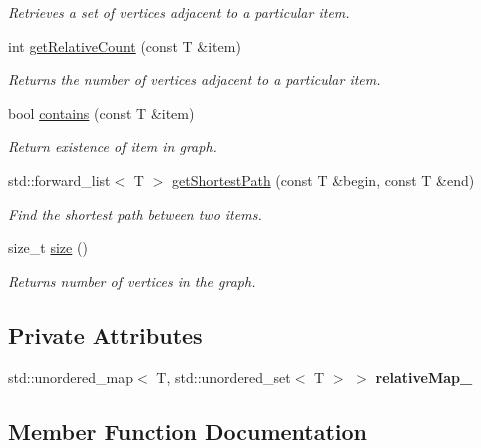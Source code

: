 \begin{DoxyCompactItemize}
\begin{DoxyCompactList}\small\item\em Retrieves a set of vertices adjacent to a particular item. \end{DoxyCompactList}\item 
int \hyperlink{class_graph_aaab69d9804f13918c7fe260b86a40d91}{get\+Relative\+Count} (const T \&item)
\begin{DoxyCompactList}\small\item\em Returns the number of vertices adjacent to a particular item. \end{DoxyCompactList}\item 
bool \hyperlink{class_graph_a9e88e1fec0b85da66ea58a39a4fdc652}{contains} (const T \&item)
\begin{DoxyCompactList}\small\item\em Return existence of item in graph. \end{DoxyCompactList}\item 
std\+::forward\+\_\+list$<$ T $>$ \hyperlink{class_graph_a30e9323548d265416291e975cfed93db}{get\+Shortest\+Path} (const T \&begin, const T \&end)
\begin{DoxyCompactList}\small\item\em Find the shortest path between two items. \end{DoxyCompactList}\item 
size\+\_\+t \hyperlink{class_graph_a98ac5dfc305ed0e31b6bb160503151ba}{size} ()
\begin{DoxyCompactList}\small\item\em Returns number of vertices in the graph. \end{DoxyCompactList}\end{DoxyCompactItemize}
\subsection*{Private Attributes}
\begin{DoxyCompactItemize}
\item 
\mbox{\label{class_graph_a949a8e9a754adedac0e83bce9e97d392}} 
std\+::unordered\+\_\+map$<$ T, std\+::unordered\+\_\+set$<$ T $>$ $>$ {\bfseries relative\+Map\+\_\+}
\end{DoxyCompactItemize}


\subsection{Member Function Documentation}
\mbox{\label{class_graph_a0d9a2a945cb00f2600f26ad63a4828d6}} 
